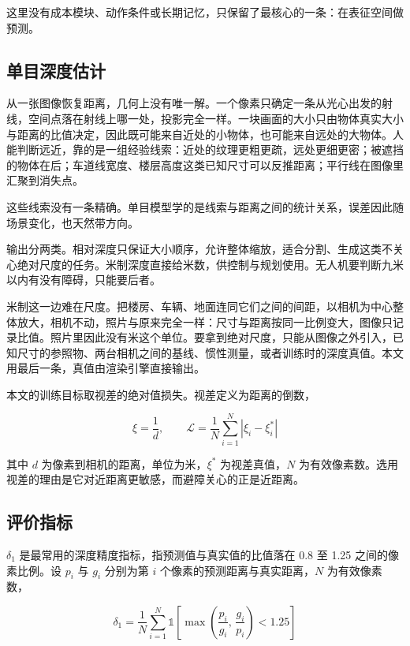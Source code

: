 \documentclass[12pt,a4paper]{ctexart}
\begin{document}
这里没有成本模块、动作条件或长期记忆，只保留了最核心的一条：在表征空间做预测。

\subsection{单目深度估计}

从一张图像恢复距离，几何上没有唯一解。一个像素只确定一条从光心出发的射线，空间点落在射线上哪一处，投影完全一样。一块画面的大小只由物体真实大小与距离的比值决定，因此既可能来自近处的小物体，也可能来自远处的大物体。人能判断远近，靠的是一组经验线索：近处的纹理更粗更疏，远处更细更密；被遮挡的物体在后；车道线宽度、楼层高度这类已知尺寸可以反推距离；平行线在图像里汇聚到消失点。

这些线索没有一条精确。单目模型学的是线索与距离之间的统计关系，误差因此随场景变化，也天然带方向。

输出分两类。相对深度只保证大小顺序，允许整体缩放，适合分割、生成这类不关心绝对尺度的任务。米制深度直接给米数，供控制与规划使用。无人机要判断九米以内有没有障碍，只能要后者。

米制这一边难在尺度。把楼房、车辆、地面连同它们之间的间距，以相机为中心整体放大，相机不动，照片与原来完全一样：尺寸与距离按同一比例变大，图像只记录比值。照片里因此没有米这个单位。要拿到绝对尺度，只能从图像之外引入，已知尺寸的参照物、两台相机之间的基线、惯性测量，或者训练时的深度真值。本文用最后一条，真值由渲染引擎直接输出。

本文的训练目标取视差的绝对值损失。视差定义为距离的倒数，

\begin{equation}
\xi = \frac{1}{d}, \qquad
\mathcal{L} = \frac{1}{N}\sum_{i=1}^{N}\left|\xi_i - \xi_i^{*}\right|
\label{eq:disp}
\end{equation}

其中 $d$ 为像素到相机的距离，单位为米，$\xi^{*}$ 为视差真值，$N$ 为有效像素数。选用视差的理由是它对近距离更敏感，而避障关心的正是近距离。

\subsection{评价指标}

$\delta_1$ 是最常用的深度精度指标，指预测值与真实值的比值落在 0.8 至 1.25 之间的像素比例。设 $p_i$ 与 $g_i$ 分别为第 $i$ 个像素的预测距离与真实距离，$N$ 为有效像素数，

\begin{equation}
\delta_1 = \frac{1}{N}\sum_{i=1}^{N}\mathbb{1}\!\left[\max\left(\frac{p_i}{g_i},\,\frac{g_i}{p_i}\right) < 1.25\right]
\label{eq:d1}
\end{equation}
\end{document}
